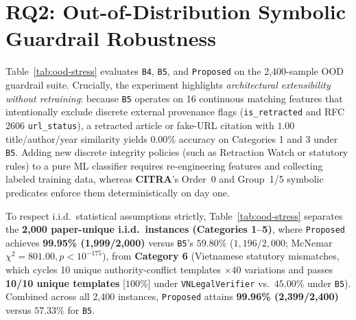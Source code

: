 
\section{RQ2: Out-of-Distribution Symbolic Guardrail Robustness}

Table~\ref{tab:ood-stress} evaluates \texttt{B4}, \texttt{B5}, and \texttt{Proposed} on the 2,400-sample OOD guardrail suite. Crucially, the experiment highlights \emph{architectural extensibility without retraining}: because \texttt{B5} operates on 16 continuous matching features that intentionally exclude discrete external provenance flags (\texttt{is\_retracted} and RFC 2606 \texttt{url\_status}), a retracted article or fake-URL citation with $1.00$ title/author/year similarity yields $0.00\%$ accuracy on Categories 1 and 3 under \texttt{B5}. Adding new discrete integrity policies (such as Retraction Watch or statutory rules) to a pure ML classifier requires re-engineering features and collecting labeled training data, whereas \textbf{CITRA}'s Order~0 and Group~1/5 symbolic predicates enforce them deterministically on day one.

To respect i.i.d.\ statistical assumptions strictly, Table~\ref{tab:ood-stress} separates the \textbf{2,000 paper-unique i.i.d.\ instances (Categories 1--5)}, where \texttt{Proposed} achieves \textbf{99.95\% (1,999/2,000)} versus \texttt{B5}'s $59.80\%$ ($1{,}196/2{,}000$; McNemar $\chi^2 = 801.00, p < 10^{-175}$), from \textbf{Category 6} (Vietnamese statutory mismatches, which cycles 10 unique authority-conflict templates $\times 40$ variations and passes \textbf{10/10 unique templates} [$100\%$] under \texttt{VNLegalVerifier} vs.\ $45.00\%$ under \texttt{B5}). Combined across all 2,400 instances, \texttt{Proposed} attains \textbf{99.96\% (2,399/2,400)} versus $57.33\%$ for \texttt{B5}.

